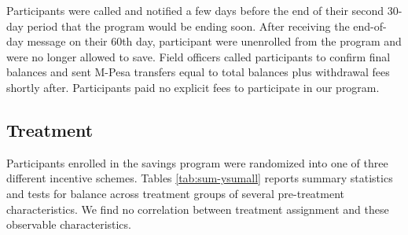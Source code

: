 \documentclass[11pt]{article}
\begin{document}
		Participants were called and notified a few days before the end of their second 30-day period that the program would be ending soon. After receiving the end-of-day message on their 60th day, participant were unenrolled from the program and were no longer allowed to save. Field officers called participants to confirm final balances and sent M-Pesa transfers equal to total balances plus withdrawal fees shortly after. Participants paid no explicit fees to participate in our program.

	\subsection{Treatment} \label{sec:treat}

		Participants enrolled in the savings program were randomized into one of three different incentive schemes. Tables \ref{tab:sum-ysumall} reports summary statistics and tests for balance across treatment groups of several pre-treatment characteristics. We find no correlation between treatment assignment and these observable characteristics.
\end{document}

